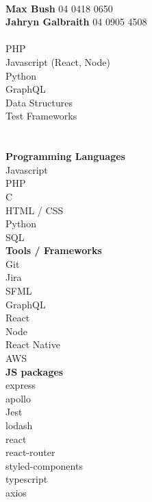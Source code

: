 \documentclass[8pt]{developercv}
\newcommand{\CC}{C\nolinebreak\hspace{-.05em}\raisebox{.4ex}{\tiny\bf +}\nolinebreak\hspace{-.10em}\raisebox{.4ex}{\tiny\bf +}}
\def\CC{{C\nolinebreak[4]\hspace{-.05em}\raisebox{.4ex}{\tiny\bf ++}}}
\begin{document}
	\begin{minipage}[t]{0.3\textwidth}		%
		\\
		\textbf{Max Bush} 04 0418 0650\\
		\textbf{Jahryn Galbraith} 04 0905 4508\\

		\\
		{PHP}\\
		{Javascript (React, Node)}\\
		{Python}\\
		{GraphQL}\\
		{Data Structures}\\
		{Test Frameworks}\\
		
		\\
		\\\textbf{Programming Languages}\\
		{Javascript}\\
		{PHP}\\
		{\CC}\\
		{HTML / CSS}\\
		{Python}\\
		{SQL}\\

		\textbf{Tools / Frameworks}\\
		{Git}\\
		{Jira}\\
		{SFML}\\
		{GraphQL}\\
		{React}\\
		{Node}\\
		{React Native}\\
		{AWS}\\
		
		\textbf{JS packages}\\
		{express}\\
		{apollo}\\
		{Jest}\\
		{lodash}\\
		{react}\\
		{react-router}\\
		{styled-components}\\
		{typescript}\\
		{axios}\\

	\end{minipage}
\end{document}
